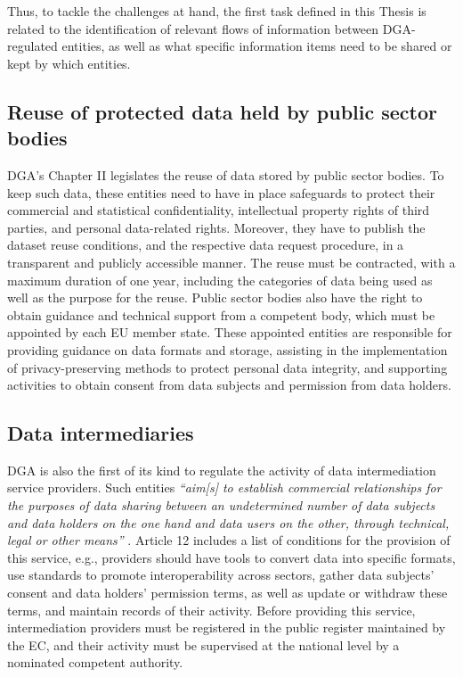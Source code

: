 Thus, to tackle the challenges at hand, the first task defined in this Thesis is related to the identification of relevant flows of information between DGA-regulated entities, as well as what specific information items need to be shared or kept by which entities.



\subsection{Reuse of protected data held by public sector bodies}
\label{sec:reuse}

DGA's Chapter II legislates the reuse of data stored by public sector bodies.
To keep such data, these entities need to have in place safeguards to protect their commercial and statistical confidentiality, intellectual property rights of third parties, and personal data-related rights.
Moreover, they have to publish the dataset reuse conditions, and the respective data request procedure, in a transparent and publicly accessible manner.
The reuse must be contracted, with a maximum duration of one year, including the categories of data being used as well as the purpose for the reuse. 
Public sector bodies also have the right to obtain guidance and technical support from a competent body, which must be appointed by each EU member state.
These appointed entities are responsible for providing guidance on data formats and storage, assisting in the implementation of privacy-preserving methods to protect personal data integrity, and supporting activities to obtain consent from data subjects and permission from data holders.

\subsection{Data intermediaries}
\label{sec:intermediation}

DGA is also the first of its kind to regulate the activity of data intermediation service providers.
Such entities \textit{``aim[s] to establish commercial relationships for the purposes of data sharing between an undetermined number of data subjects and data holders on the one hand and data users on the other, through technical, legal or other means''} \citeyearpar{noauthor_regulation_2022}.
Article 12 includes a list of conditions for the provision of this service, e.g., providers should have tools to convert data into specific formats, use standards to promote interoperability across sectors, gather data subjects' consent and data holders' permission terms, as well as update or withdraw these terms, and maintain records of their activity.
Before providing this service, intermediation providers must be registered in the public register maintained by the EC, and their activity must be supervised at the national level by a nominated competent authority.


